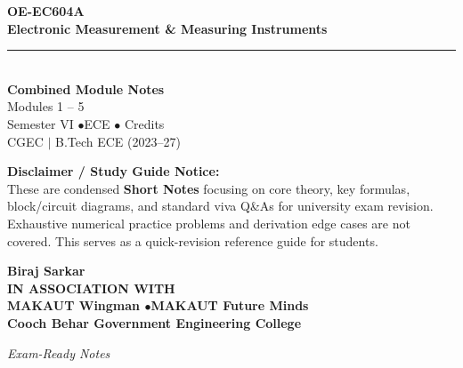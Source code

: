 \documentclass[12pt,a4paper]{article}
\begin{document}
\thispagestyle{empty}


\vspace*{1.0cm}
\begin{center}
  {\Huge\bfseries\color{myred} OE-EC604A}\\[10pt]
  {\LARGE\bfseries\color{mydark} Electronic Measurement \& Measuring Instruments}\\[20pt]
  {\color{myred}\rule{0.7\linewidth}{1.5pt}}\\[18pt]
  {\Large\color{myteal}\textbf{Combined Module Notes}}\\[8pt]
  {\large\color{mydark} Modules 1 -- 5}\\[40pt]
  {\normalsize\color{mydark} Semester VI \quad$\bullet$\quad ECE \quad$\bullet$ Credits}\\[12pt]
  {\normalsize\color{mydark} CGEC \;$|$\; B.Tech ECE (2023--27)}
\end{center}
\vspace{1.0cm}
\begin{center}
  \begin{tcolorbox}[colback=mygray, colframe=mgframe, boxrule=0.5pt, arc=3pt, width=0.85\linewidth]
    \centering\small\color{mydark}
    \textbf{Disclaimer / Study Guide Notice:}\\
    These are condensed \textbf{Short Notes} focusing on core theory, key formulas, block/circuit diagrams, and standard viva Q\&As for university exam revision. Exhaustive numerical practice problems and derivation edge cases are not covered. This serves as a quick-revision reference guide for students.
  \end{tcolorbox}
\end{center}
\vfill
\vspace{0.6cm}
\begin{center}
  {\large\bfseries\color{mypurple} Biraj Sarkar}\\[16pt]
  {\footnotesize\color{watermark}\textbf{IN ASSOCIATION WITH}}\\[8pt]
  {\small\bfseries\color{mydark} MAKAUT Wingman \quad$\bullet$\quad MAKAUT Future Minds}\\[12pt]
  {\large\bfseries\color{myteal} Cooch Behar Government Engineering College}
\end{center}
\vfill
\begin{center}{\small\color{watermark}\textit{Exam-Ready Notes}}\end{center}
\clearpage
\end{document}
